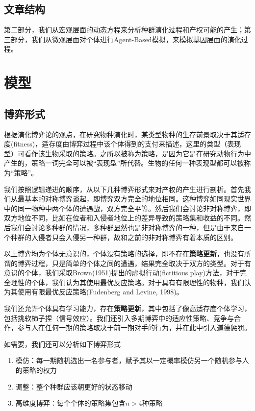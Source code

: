 \documentclass[lang=cn,12pt,a4paper]{elegantpaper}
\begin{document}
\subsection{文章结构	}

第二部分，我们从宏观层面的动态方程来分析种群演化过程和产权可能的产生；第三部分，我们从微观层面对个体进行Agent-Based模拟，来模拟基因层面的演化过程。


\section{模型}

\subsection{博弈形式}

根据演化博弈论的观点，在研究物种演化时，某类型物种的生存前景取决于其适存度(fitness)，适存度由博弈过程中该个体得到的支付来描述，这里的类型（表现型）可看作该生物采取的策略。之所以被称为策略，是因为它是在研究动物行为中产生的，策略一词完全可以被“表现型”所代替。生物的任何一种表现型都可以被称为“策略”。

我们按照逻辑递进的顺序，从以下几种博弈形式来对产权的产生进行剖析。首先我们从最基本的对称博弈谈起，即博弈双方完全的地位相同。这种博弈如同现实世界中的同一物种中两个体的遭遇战，双方完全平等。然后我们会讨论非对称博弈，即双方地位不同，比如在位者和入侵者地位上的差异导致的策略集和收益的不同。然后我们会讨论多种群的情况，多种群显然也是非对称博弈的一种，但是由于来自一个种群的入侵者只会入侵另一种群，故和之前的非对称博弈有着本质的区别。

以上博弈均为个体无意识的，个体没有策略的选择，即不存在\textbf{策略更新}，也没有所谓的博弈过程，只是简单的个体之间的遭遇，结果完全取决于双方的类型。对于有意识的个体，我们采取Brown(1951)提出的虚拟行动(fictitious play)方法，对于完全理性的个体，我们认为其使用最优反应策略。对于具有有限理性的物种，我们认为其使用有限最优反应策略(Fudenberg and Levine, 1998)。

我们还允许个体具有学习能力，存在\textbf{策略更新}，其中包括了像高适存度个体学习，包括挑软柿子捏（信号效应）。我们还引入多期博弈中的适应性策略、竞争与合作，参与人在任何一期的策略取决于前一期对手的行为，并在此中引入道德惩罚。

如需要，我们还可以分析如下博弈形式
\begin{enumerate}
\item 模仿：每一期随机选出一名参与者，赋予其以一定概率模仿另一个随机参与人的策略的权力
\item 调整：整个种群应该朝更好的状态移动
\item 高维度博弈：每个个体的策略集包含$n>4$种策略
\end{enumerate}
\end{document}
